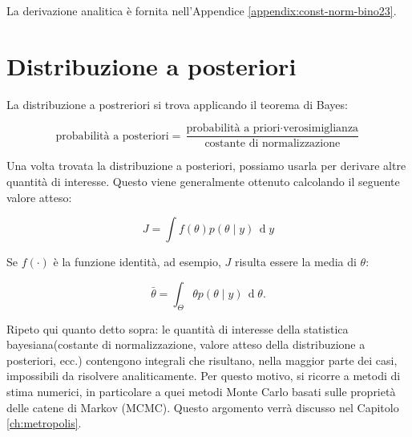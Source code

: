 \documentclass[
  11pt,
]{krantz}
\makeatletter
\newenvironment{Shaded}{\begin{snugshade}}{\end{snugshade}}
\newcommand{\AttributeTok}[1]{\textcolor[rgb]{0.61,0.61,0.61}{#1}}
\newcommand{\CommentTok}[1]{\textcolor[rgb]{0.37,0.37,0.37}{\textit{#1}}}
\newcommand{\ControlFlowTok}[1]{\textcolor[rgb]{0.27,0.27,0.27}{\textbf{#1}}}
\newcommand{\DecValTok}[1]{\textcolor[rgb]{0.06,0.06,0.06}{#1}}
\newcommand{\FunctionTok}[1]{\textcolor[rgb]{0,0,0}{#1}}
\newcommand{\NormalTok}[1]{#1}
\newcommand{\OtherTok}[1]{\textcolor[rgb]{0.37,0.37,0.37}{#1}}
\newcommand{\SpecialCharTok}[1]{\textcolor[rgb]{0,0,0}{#1}}
\newenvironment{kframe}{%
\medskip{}
\setlength{\fboxsep}{.8em}
 \def\at@end@of@kframe{}%
 \ifinner\ifhmode%
  \def\at@end@of@kframe{\end{minipage}}%
  \begin{minipage}{\columnwidth}%
 \fi\fi%
 \def\FrameCommand##1{\hskip\@totalleftmargin \hskip-\fboxsep
 \colorbox{shadecolor}{##1}\hskip-\fboxsep
     \hskip-\linewidth \hskip-\@totalleftmargin \hskip\columnwidth}%
 \MakeFramed {\advance\hsize-\width
   \@totalleftmargin\z@ \linewidth\hsize
   \@setminipage}}%
 {\par\unskip\endMakeFramed%
 \at@end@of@kframe}
\renewenvironment{Shaded}{\begin{kframe}}{\end{kframe}}
\theoremstyle{definition}
\theoremstyle{definition}
\theoremstyle{definition}
\theoremstyle{definition}
\theoremstyle{remark}
\makeatother
\begin{document}
\begin{Shaded}
\end{Shaded}

La derivazione analitica è fornita nell'Appendice \ref{appendix:const-norm-bino23}.

\hypertarget{distribuzione-a-posteriori}{%
\section{Distribuzione a posteriori}\label{distribuzione-a-posteriori}}

La distribuzione a postreriori si trova applicando il teorema di Bayes:

\[
\text{probabilità a posteriori} = \frac{\text{probabilità a priori} \cdot \text{verosimiglianza}}{\text{costante di normalizzazione}}
\]

Una volta trovata la distribuzione a posteriori, possiamo usarla per derivare altre quantità di interesse. Questo viene generalmente ottenuto calcolando il seguente valore atteso:

\[
J = \int f(\theta) p(\theta \mid y) \,\operatorname {d}\!y
\]

Se \(f(\cdot)\) è la funzione identità, ad esempio, \(J\) risulta essere la media di \(\theta\):

\[
\bar{\theta} = \int_{\Theta} \theta p(\theta \mid y) \,\operatorname {d}\!\theta .
\]

Ripeto qui quanto detto sopra: le quantità di interesse della statistica bayesiana(costante di normalizzazione, valore atteso della distribuzione a posteriori, ecc.) contengono integrali che risultano, nella maggior parte dei casi, impossibili da risolvere analiticamente. Per questo motivo, si ricorre a metodi di stima numerici, in particolare a quei metodi Monte Carlo basati sulle proprietà delle catene di Markov (MCMC). Questo argomento verrà discusso nel Capitolo \ref{ch:metropolis}.
\end{document}
